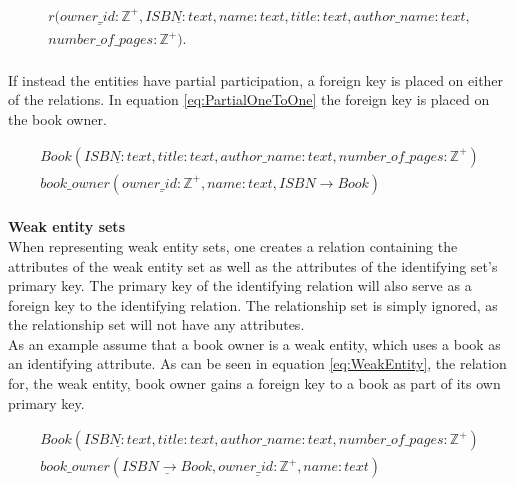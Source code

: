 \begin{equation}\label{eq:TotalOneToOne}
    \begin{split}
        r(\underline{owner\_id:\mathbb{Z}^+},\underline{ISBN: text}, name:text, title:text, author\_name:text, \\ number\_of\_pages:\mathbb{Z}^+).
    \end{split}
\end{equation}
\\
If instead the entities have partial participation, a foreign key is placed on either of the relations. In equation \ref{eq:PartialOneToOne} the foreign key is placed on the book owner.

\begin{equation}\label{eq:PartialOneToOne}
    \begin{split}
        Book(\underline{ISBN : text} , title : text , author\_name : text , number\_of\_pages : \mathbb{Z}^+) \\
        book\_owner(\underline{owner\_id:\mathbb{Z}^+} , name:text , ISBN \rightarrow Book)
    \end{split}
\end{equation}
\\

\textbf{Weak entity sets}\\
When representing weak entity sets, one creates a relation containing the attributes of the weak entity set as well as the attributes of the identifying set's primary key.
The primary key of the identifying relation will also serve as a foreign key to the identifying relation\cite{DBSBook}.
The relationship set is simply ignored, as the relationship set will not have any attributes\cite{DBSBook}. \\
As an example assume that a book owner is a weak entity, which uses a book as an identifying attribute. As can be seen in equation \ref{eq:WeakEntity}, the relation for, the weak entity, book owner gains a foreign key to a book as part of its own primary key.

\begin{equation}\label{eq:WeakEntity}
    \begin{split}
        Book(\underline{ISBN : text} , title : text , author\_name : text , number\_of\_pages : \mathbb{Z}^+) \\
        book\_owner(\underline{ISBN \rightarrow Book}, \underline{owner\_id:\mathbb{Z}^+} , name:text)
    \end{split}
\end{equation}
\\